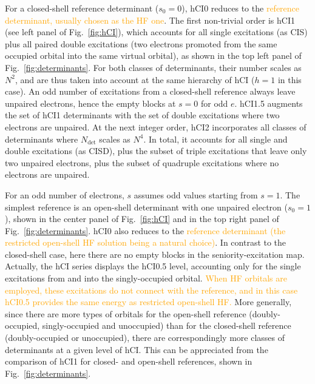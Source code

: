 \documentclass[aip,jcp,reprint,noshowkeys,superscriptaddress]{revtex4-1}
\newcommand{\fk}[1]{\textcolor{orange}{#1}}
\newcommand{\Ndet}{N_\text{det}}
\begin{document}
For a closed-shell reference determinant ($s_0=0$), hCI0 reduces to the \fk{reference determinant, usually chosen as the HF one}.
The first non-trivial order is hCI1 (see left panel of Fig.~\ref{fig:hCI}), which accounts for all single excitations (as CIS)
plus all paired double excitations (two electrons promoted from the same occupied orbital into the same virtual orbital),
as shown in the top left panel of Fig.~\ref{fig:determinants}.
For both classes of determinants, their number scales as $N^2$, and are thus taken into account at the same hierarchy of hCI ($h=1$ in this case).
An odd number of excitations from a closed-shell reference always leave unpaired electrons, hence the empty blocks at $s=0$ for odd $e$.
hCI1.5 augments the set of hCI1 determinants with the set of double excitations where two electrons are unpaired.
At the next integer order, hCI2 incorporates all classes of determinants where $\Ndet$ scales as $N^4$.
In total, it accounts for all single and double excitations (as CISD), plus the subset of triple excitations that leave only two unpaired electrons,
plus the subset of quadruple excitations where no electrons are unpaired.
\fk{}

For an odd number of electrons, $s$ assumes odd values starting from $s=1$.
The simplest reference is an open-shell determinant with one unpaired electron ($s_0=1$), shown in the center panel of Fig.~\ref{fig:hCI} and in the top right panel of Fig.~\ref{fig:determinants}.
hCI0 also reduces to the \fk{reference determinant (the restricted open-shell HF solution being a natural choice)}.
In contrast to the closed-shell case, here there are no empty blocks in the seniority-excitation map.
Actually, the hCI series displays the hCI0.5 level, accounting only for the single excitations from and into the singly-occupied orbital.
\fk{When HF orbitals are employed, these excitations do not connect with the reference, and in this case hCI0.5 provides the same energy as restricted open-shell HF.}
More generally, since there are more types of orbitals for the open-shell reference (doubly-occupied, singly-occupied and unoccupied) than for the closed-shell reference (doubly-occupied or unoccupied),
there are correspondingly more classes of determinants at a given level of hCI.
This can be appreciated from the comparison of hCI1 for closed- and open-shell references, shown in Fig.~\ref{fig:determinants}.
\end{document}

